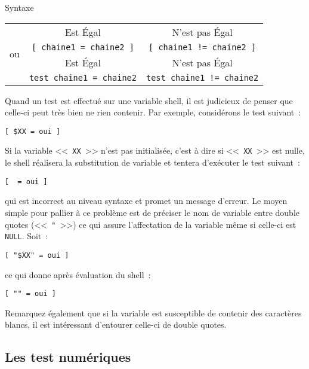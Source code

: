 \begin{definition}{Syntaxe}
\begin{tabular}{l@{\hspace{2ex}}c@{\hspace{3ex}}c}
	\multirow{5}{3ex}{ou}
	&	Est \'{E}gal	&	N'est pas \'{E}gal	\\
	&	\verb*,[ chaine1 = chaine2 ],	&	\verb*,[ chaine1 != chaine2 ],	\\[2ex]
	&	Est \'{E}gal	&	N'est pas \'{E}gal	\\
	&	\verb*,test chaine1 = chaine2,	&	\verb*,test chaine1 != chaine2,	\\
\end{tabular}
\end{definition}

Quand un test est
effectu{\'e} sur une variable shell, il est judicieux de penser que
celle-ci peut tr{\`e}s bien ne rien contenir. Par exemple,
consid{\'e}rons le test suivant~:
\begin{center}
\verb,[ $XX = oui ],
\end{center}

Si la variable <<~\texttt{XX}~>> n'est pas initialis{\'e}e, c'est {\`a} dire si
<<~\texttt{XX}~>> est nulle, le shell r{\'e}alisera la substitution de
variable et tentera d'ex{\'e}cuter le test suivant~:
\begin{center}
\verb,[  = oui ],
\end{center}
qui est incorrect au niveau syntaxe et promet un message d'erreur. Le
moyen simple pour pallier {\`a} ce probl{\`e}me est de pr{\'e}ciser le nom de
variable entre double quotes (<<~\verb="=~>>) ce qui assure l'affectation de la
variable m{\^e}me si celle-ci est \texttt{NULL}. Soit~:
\begin{center}
\verb,[ "$XX" = oui ],
\end{center}
ce qui donne apr{\`e}s {\'e}valuation du shell~:
\begin{center}
\verb,[ "" = oui ],
\end{center}

Remarquez {\'e}galement que si la variable est susceptible de contenir des
caract{\`e}res blancs, il est int{\'e}ressant d'entourer celle-ci de double
quotes.

\subsection{Les test num{\'e}riques}

